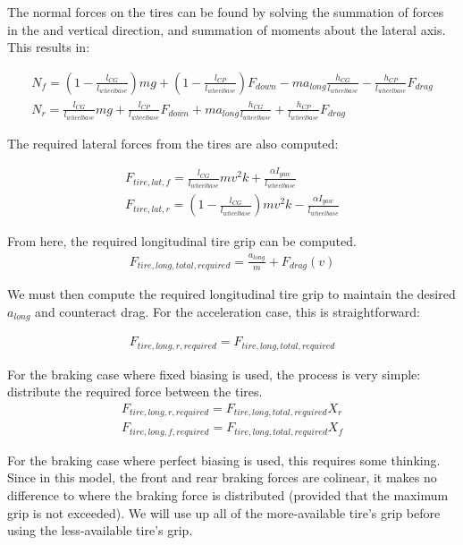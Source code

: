 \documentclass{article}
\begin{document}
The normal forces on the tires can be found by solving the summation of forces in the and vertical direction, and summation of moments about the lateral axis. This results in:

\begin{align}
	N_f = (1 - \frac{l_{CG}}{l_{wheelbase}}) m g 
			+ (1 - \frac{l_{CP}}{l_{wheelbase}}) F_{down}
			- m a_{long} \frac{h_{CG}}{l_{wheelbase}} 
			- \frac{h_{CP}}{l_{wheelbase}} F_{drag} \\
	N_r = \frac{l_{CG}}{l_{wheelbase}} m g 
			+ \frac{l_{CP}}{l_{wheelbase}} F_{down}
			+ m a_{long} \frac{h_{CG}}{l_{wheelbase}} 
			+ \frac{h_{CP}}{l_{wheelbase}} F_{drag}
\end{align}

The required lateral forces from the tires are also computed:

\begin{align}
	F_{tire,lat,f} = \frac{l_{CG}}{l_{wheelbase}} m v^2 k + \frac{\alpha I_{yaw}}{l_{wheelbase}}  \\ 
	F_{tire,lat,r} = (1-\frac{l_{CG}}{l_{wheelbase}}) m v^2 k - \frac{\alpha I_{yaw}}{l_{wheelbase}}
\end{align}

From here, the required longitudinal tire grip can be computed.
\begin{align}
	F_{tire,long,total,required} = \frac{a_{long}}{m} + F_{drag}(v)
\end{align}

We must then compute the required longitudinal tire grip to maintain the desired $a_{long}$ and counteract drag. For the acceleration case, this is straightforward:

\begin{align}
	F_{tire,long,r,required} = F_{tire,long,total,required}
\end{align}

For the braking case where fixed biasing is used, the process is very simple: distribute the required force between the tires.
\begin{align}
	F_{tire,long,r,required} = F_{tire,long,total,required} X_r \\
	F_{tire,long,f,required} = F_{tire,long,total,required} X_f
\end{align}

For the braking case where perfect biasing is used, this requires some thinking. Since in this model, the front and rear braking forces are colinear, it makes no difference to where the braking force is distributed (provided that the maximum grip is not exceeded). We will use up all of the more-available tire's grip before using the less-available tire's grip.
\end{document}

